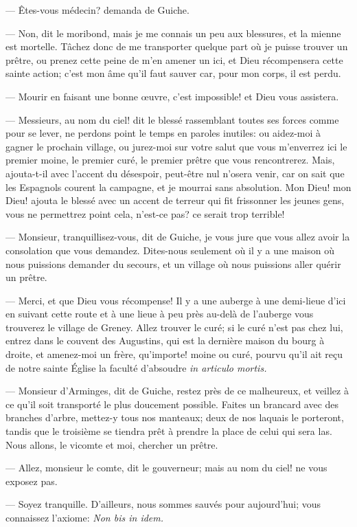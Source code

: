 — Êtes-vous médecin? demanda de Guiche.

— Non, dit le moribond, mais je me connais un peu aux blessures, et la mienne est mortelle. Tâchez donc de me transporter quelque part où je puisse trouver un prêtre, ou prenez cette peine de m'en amener un ici, et Dieu récompensera cette sainte action; c'est mon âme qu'il faut sauver car, pour mon corps, il est perdu.

— Mourir en faisant une bonne œuvre, c'est impossible! et Dieu vous assistera.

— Messieurs, au nom du ciel! dit le blessé rassemblant toutes ses forces comme pour se lever, ne perdons point le temps en paroles inutiles: ou aidez-moi à gagner le prochain village, ou jurez-moi sur votre salut que vous m'enverrez ici le premier moine, le premier curé, le premier prêtre que vous rencontrerez. Mais, ajouta-t-il avec l'accent du désespoir, peut-être nul n'osera venir, car on sait que les Espagnols courent la campagne, et je mourrai sans absolution. Mon Dieu! mon Dieu! ajouta le blessé avec un accent de terreur qui fit frissonner les jeunes gens, vous ne permettrez point cela, n'est-ce pas? ce serait trop terrible!

— Monsieur, tranquillisez-vous, dit de Guiche, je vous jure que vous allez avoir la consolation que vous demandez. Dites-nous seulement où il y a une maison où nous puissions demander du secours, et un village où nous puissions aller quérir un prêtre.

— Merci, et que Dieu vous récompense! Il y a une auberge à une demi-lieue d'ici en suivant cette route et à une lieue à peu près au-delà de l'auberge vous trouverez le village de Greney. Allez trouver le curé; si le curé n'est pas chez lui, entrez dans le couvent des Augustins, qui est la dernière maison du bourg à droite, et amenez-moi un frère, qu'importe! moine ou curé, pourvu qu'il ait reçu de notre sainte Église la faculté d'absoudre \textit{in articulo mortis.}

— Monsieur d'Arminges, dit de Guiche, restez près de ce malheureux, et veillez à ce qu'il soit transporté le plus doucement possible. Faites un brancard avec des branches d'arbre, mettez-y tous nos manteaux; deux de nos laquais le porteront, tandis que le troisième se tiendra prêt à prendre la place de celui qui sera las. Nous allons, le vicomte et moi, chercher un prêtre.

— Allez, monsieur le comte, dit le gouverneur; mais au nom du ciel! ne vous exposez pas.

— Soyez tranquille. D'ailleurs, nous sommes sauvés pour aujourd'hui; vous connaissez l'axiome:\textit{ Non bis in idem.}

